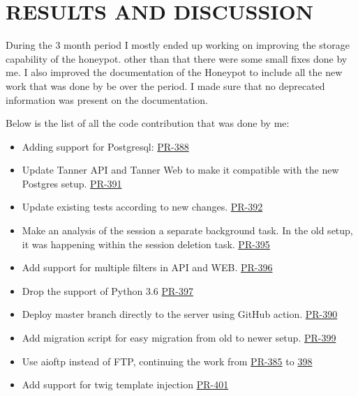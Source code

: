 \newpage
\thispagestyle{empty}
\chapter{RESULTS AND DISCUSSION}
During the 3 month period I mostly ended up working on improving the storage capability of the honeypot. other than that there were some small fixes done by me. I also improved the documentation of the Honeypot to include all the new work that was done by be over the period. I made sure that no deprecated information was present on the documentation.

Below is the list of all the code contribution that was done by me:

\begin{itemize}
    \item Adding support for Postgresql: \href{https://github.com/mushorg/tanner/pull/388}{PR-388}
        
    \item Update Tanner API and Tanner Web to make it compatible with the new Postgres setup. \href{https://github.com/mushorg/tanner/pull/391}{PR-391}

    \item Update existing tests according to new changes. \href{https://github.com/mushorg/tanner/pull/392}{PR-392}

    \item Make an analysis of the session a separate background task. In the old setup, it was happening within the session deletion task. \href{https://github.com/mushorg/tanner/pull/395}{PR-395}

    \item Add support for multiple filters in API and WEB. \href{https://github.com/mushorg/tanner/pull/396}{PR-396}

    \item Drop the support of Python 3.6 \href{https://github.com/mushorg/tanner/pull/397}{PR-397}

    \item Deploy master branch directly to the server using GitHub action. \href{https://github.com/mushorg/tanner/pull/390}{PR-390}

    \item Add migration script for easy migration from old to newer setup. \href{https://github.com/mushorg/tanner/pull/399}{PR-399}
    
    \item Use aioftp instead of FTP, continuing the work from \href{https://github.com/mushorg/tanner/pull/385}{PR-385} to \href{https://github.com/mushorg/tanner/pull/398}{398}

    \item Add support for twig template injection \href{https://github.com/mushorg/tanner/pull/401}{PR-401}

\end{itemize}
\vfill